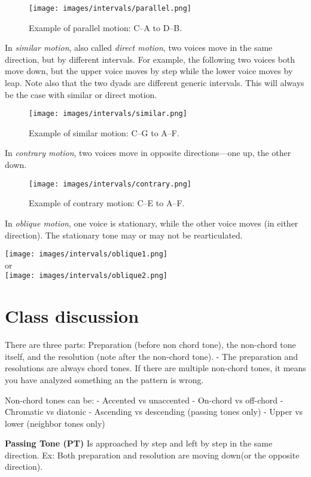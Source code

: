 \documentclass{book}
\begin{document}
\begin{figure}
\centering
\texttt{[image: images/intervals/parallel.png]}
\caption{Example of parallel motion: C--A to D--B.}
\end{figure}

In \emph{similar motion}, also called \emph{direct motion}, two voices move in
the same direction, but by different intervals. For example, the following two
voices both move down, but the upper voice moves by step while the lower voice
moves by leap. Note also that the two dyads are different generic intervals.
This will always be the case with similar or direct motion.

\begin{figure}
\centering
\texttt{[image: images/intervals/similar.png]}
\caption{Example of similar motion: C--G to A--F.}
\end{figure}

In \emph{contrary motion}, two voices move in opposite directions---one up,
the other down.

\begin{figure}
\centering
\texttt{[image: images/intervals/contrary.png]}
\caption{Example of contrary motion: C--E to A--F.}
\end{figure}

In \emph{oblique motion}, one voice is stationary, while the other voice moves
(in either direction). The stationary tone may or may not be rearticulated.

\texttt{[image: images/intervals/oblique1.png]}\\
or\\
\texttt{[image: images/intervals/oblique2.png]}

\hypertarget{class-discussion-6}{%
\section{Class discussion}\label{class-discussion-6}}

There are three parts: Preparation (before non chord tone), the non-chord tone
itself, and the resolution (note after the non-chord tone). - The preparation
and resolutions are always chord tones. If there are multiple non-chord tones,
it means you have analyzed something an the pattern is wrong.

Non-chord tones can be: - Accented vs unaccented - On-chord vs off-chord -
Chromatic vs diatonic - Ascending vs descending (passing tones only) - Upper
vs lower (neighbor tones only)

\textbf{Passing Tone (PT)} Is approached by step and left by step in the same
direction. Ex: Both preparation and resolution are moving down(or the opposite
direction).
\end{document}
